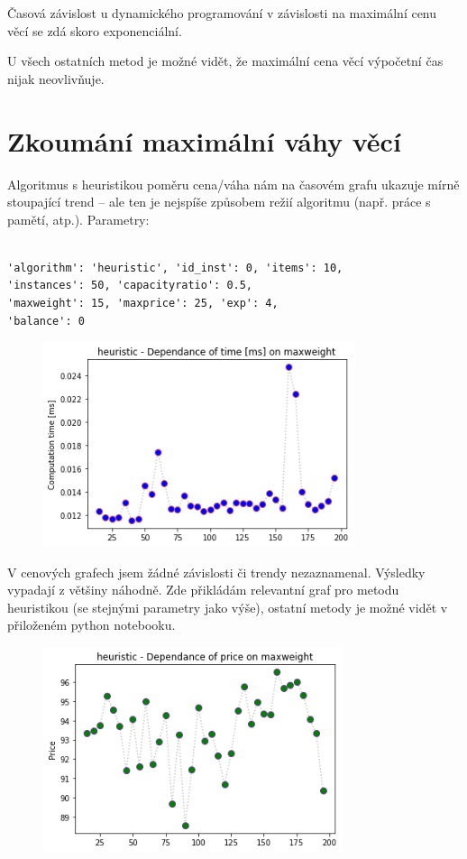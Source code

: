 \documentclass[a4paper,10pt,twocolumn]{article}
\begin{document}
Časová závislost u dynamického programování v závislosti na maximální cenu věcí se zdá skoro exponenciální.

U všech ostatních metod je možné vidět, že maximální cena věcí výpočetní čas nijak neovlivňuje.
\section{Zkoumání maximální váhy věcí}

Algoritmus s heuristikou poměru cena/váha nám  na časovém grafu ukazuje mírně stoupající trend -- ale ten je nejspíše způsobem režií algoritmu (např. práce s pamětí, atp.).
Parametry:
   \begin{verbatim}

'algorithm': 'heuristic', 'id_inst': 0, 'items': 10,
'instances': 50, 'capacityratio': 0.5,
'maxweight': 15, 'maxprice': 25, 'exp': 4,
'balance': 0
    \end{verbatim}

\begin{figure}[H]
  \begin{center}
    \includegraphics[height=6cm]{graphs/time_on_maxweight_heuristic.png}
  \end{center}
\end{figure}


V cenových grafech jsem žádné závislosti či trendy nezaznamenal. Výsledky vypadají z většiny náhodně. Zde přikládám relevantní graf pro metodu heuristikou (se stejnými parametry jako výše), ostatní metody je možné vidět v přiloženém python notebooku. 

\begin{figure}[H]
  \begin{center}
    \includegraphics[height=6cm]{graphs/price_on_maxweight_heuristic.png}
  \end{center}
\end{figure}
\end{document}

